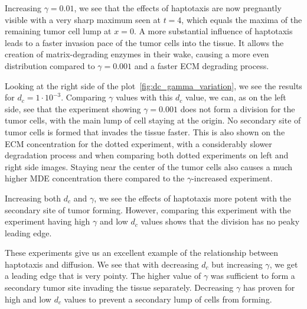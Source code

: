 Increasing $\gamma=0.01$, we see that the effects of haptotaxis are now pregnantly visible with a very sharp maximum seen at $t=4$, which equals the maxima of the remaining tumor cell lump at $x=0$. A more substantial influence of haptotaxis leads to a faster invasion pace of the tumor cells into the tissue. It allows the creation of matrix-degrading enzymes in their wake, causing a more even distribution compared to $\gamma=0.001$ and a faster ECM degrading process. 

Looking at the right side of the plot~\ref{fig:dc_gamma_variation}, we see the results for $d_c=1 \cdot 10^{-3}$. Comparing $\gamma$ values with this $d_c$ value, we can, as on the left side, see that the experiment showing $\gamma=0.001$ does not form a division for the tumor cells, with the main lump of cell staying at the origin. No secondary site of tumor cells is formed that invades the tissue faster. This is also shown on the ECM concentration for the dotted experiment, with a considerably slower degradation process and when comparing both dotted experiments on left and right side images. Staying near the center of the tumor cells also causes a much higher MDE concentration there compared to the $\gamma$-increased experiment. 

Increasing both $d_c$ and $\gamma$, we see the effects of haptotaxis more potent with the secondary site of tumor forming. However, comparing this experiment with the experiment having high $\gamma$ and low $d_c$ values shows that the division has no peaky leading edge.

These experiments give us an excellent example of the relationship between haptotaxis and diffusion. We see that with decreasing $d_c$ but increasing $\gamma$, we get a leading edge that is very pointy. The higher value of $\gamma$ was sufficient to form a secondary tumor site invading the tissue separately. Decreasing $\gamma$ has proven for high and low $d_c$ values to prevent a secondary lump of cells from forming. 

